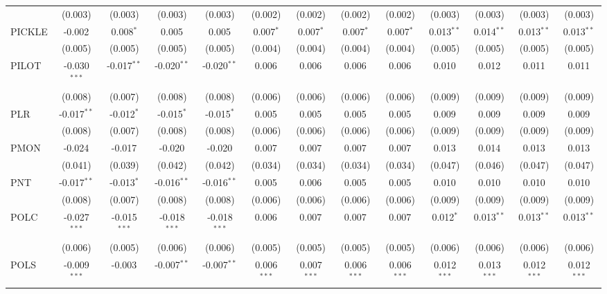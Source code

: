 \begin{table}[!htbp]
\begin{tabular}{@{\extracolsep{5pt}}lcccccccccccc}
  & (0.003) & (0.003) & (0.003) & (0.003) & (0.002) & (0.002) & (0.002) & (0.002) & (0.003) & (0.003) & (0.003) & (0.003) \\
 PICKLE & -0.002$^{}$ & 0.008$^{*}$ & 0.005$^{}$ & 0.005$^{}$ & 0.007$^{*}$ & 0.007$^{*}$ & 0.007$^{*}$ & 0.007$^{*}$ & 0.013$^{**}$ & 0.014$^{**}$ & 0.013$^{**}$ & 0.013$^{**}$ \\
  & (0.005) & (0.005) & (0.005) & (0.005) & (0.004) & (0.004) & (0.004) & (0.004) & (0.005) & (0.005) & (0.005) & (0.005) \\
 PILOT & -0.030$^{***}$ & -0.017$^{**}$ & -0.020$^{**}$ & -0.020$^{**}$ & 0.006$^{}$ & 0.006$^{}$ & 0.006$^{}$ & 0.006$^{}$ & 0.010$^{}$ & 0.012$^{}$ & 0.011$^{}$ & 0.011$^{}$ \\
  & (0.008) & (0.007) & (0.008) & (0.008) & (0.006) & (0.006) & (0.006) & (0.006) & (0.009) & (0.009) & (0.009) & (0.009) \\
 PLR & -0.017$^{**}$ & -0.012$^{*}$ & -0.015$^{*}$ & -0.015$^{*}$ & 0.005$^{}$ & 0.005$^{}$ & 0.005$^{}$ & 0.005$^{}$ & 0.009$^{}$ & 0.009$^{}$ & 0.009$^{}$ & 0.009$^{}$ \\
  & (0.008) & (0.007) & (0.008) & (0.008) & (0.006) & (0.006) & (0.006) & (0.006) & (0.009) & (0.009) & (0.009) & (0.009) \\
 PMON & -0.024$^{}$ & -0.017$^{}$ & -0.020$^{}$ & -0.020$^{}$ & 0.007$^{}$ & 0.007$^{}$ & 0.007$^{}$ & 0.007$^{}$ & 0.013$^{}$ & 0.014$^{}$ & 0.013$^{}$ & 0.013$^{}$ \\
  & (0.041) & (0.039) & (0.042) & (0.042) & (0.034) & (0.034) & (0.034) & (0.034) & (0.047) & (0.046) & (0.047) & (0.047) \\
 PNT & -0.017$^{**}$ & -0.013$^{*}$ & -0.016$^{**}$ & -0.016$^{**}$ & 0.005$^{}$ & 0.006$^{}$ & 0.005$^{}$ & 0.005$^{}$ & 0.010$^{}$ & 0.010$^{}$ & 0.010$^{}$ & 0.010$^{}$ \\
  & (0.008) & (0.007) & (0.008) & (0.008) & (0.006) & (0.006) & (0.006) & (0.006) & (0.009) & (0.009) & (0.009) & (0.009) \\
 POLC & -0.027$^{***}$ & -0.015$^{***}$ & -0.018$^{***}$ & -0.018$^{***}$ & 0.006$^{}$ & 0.007$^{}$ & 0.007$^{}$ & 0.007$^{}$ & 0.012$^{*}$ & 0.013$^{**}$ & 0.013$^{**}$ & 0.013$^{**}$ \\
  & (0.006) & (0.005) & (0.006) & (0.006) & (0.005) & (0.005) & (0.005) & (0.005) & (0.006) & (0.006) & (0.006) & (0.006) \\
 POLS & -0.009$^{***}$ & -0.003$^{}$ & -0.007$^{**}$ & -0.007$^{**}$ & 0.006$^{***}$ & 0.007$^{***}$ & 0.006$^{***}$ & 0.006$^{***}$ & 0.012$^{***}$ & 0.013$^{***}$ & 0.012$^{***}$ & 0.012$^{***}$ \\

\end{tabular}
\end{table}
